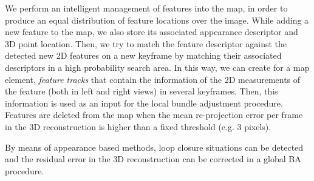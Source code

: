 We perform an intelligent management of features into the map, in
order to produce an equal distribution of feature locations over the
image. While adding a new feature to the map, we also store its
associated appearance descriptor and 3D point location. Then, we try
to match the feature descriptor against the detected new 2D features
on a new keyframe by matching their associated descriptors in a high
probability search area. In this way, we can create for a map element,
\textit{feature tracks} that contain the information of the 2D
measurements of the feature (both in left and right views) in several
keyframes. Then, this information is used as an input for the local
bundle adjustment procedure. Features are deleted from the map when
the mean re-projection error per frame in the 3D reconstruction is
higher than a fixed threshold (e.g. 3 pixels).

By means of appearance based methods, loop closure situations can be
detected and the residual error in the 3D reconstruction can be
corrected in a global BA procedure.


